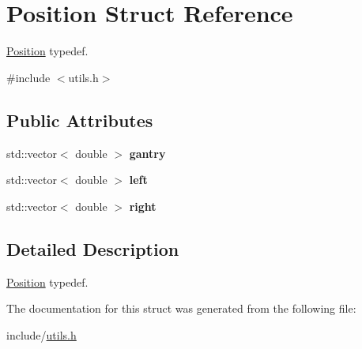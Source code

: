 \hypertarget{structPosition}{}\section{Position Struct Reference}
\label{structPosition}


\hyperlink{structPosition}{Position} typedef.  




{\ttfamily \#include $<$utils.\+h$>$}

\subsection*{Public Attributes}
\begin{DoxyCompactItemize}
\item 
\mbox{\label{structPosition_a506a046a9a58d3aae47d637aee0ea432}} 
std\+::vector$<$ double $>$ {\bfseries gantry}
\item 
\mbox{\label{structPosition_a31a63b03b11c8b38820596aa75fbc70f}} 
std\+::vector$<$ double $>$ {\bfseries left}
\item 
\mbox{\label{structPosition_a4212665c40ee3db37d21dd0925b252e8}} 
std\+::vector$<$ double $>$ {\bfseries right}
\end{DoxyCompactItemize}


\subsection{Detailed Description}
\hyperlink{structPosition}{Position} typedef. 

The documentation for this struct was generated from the following file\+:\begin{DoxyCompactItemize}
\item 
include/\hyperlink{utils_8h}{utils.\+h}\end{DoxyCompactItemize}
